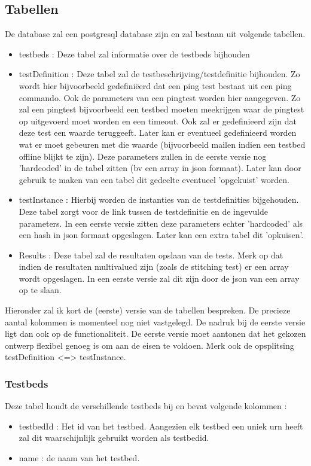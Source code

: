 \documentclass[11pt]{article}
\begin{document}
\subsection{Tabellen}
De database zal een postgresql database zijn en zal bestaan uit volgende tabellen.
\begin{itemize}
\item testbeds : Deze tabel zal informatie over de testbeds bijhouden
\item testDefinition : Deze tabel zal de testbeschrijving/testdefinitie bijhouden. Zo wordt hier bijvoorbeeld gedefini\"eerd dat een ping test bestaat uit een ping commando. Ook de parameters van een pingtest worden hier aangegeven. Zo zal een pingtest bijvoorbeeld een testbed moeten meekrijgen waar de pingtest op uitgevoerd moet worden en een timeout. Ook zal er gedefinieerd zijn dat deze test een waarde teruggeeft. Later kan er eventueel gedefinieerd worden wat er moet gebeuren met die waarde (bijvoorbeeld mailen indien een testbed offline blijkt te zijn).
Deze parameters zullen in de eerste versie nog 'hardcoded' in de tabel zitten (bv een array in json formaat). Later kan door gebruik te maken van een tabel dit gedeelte eventueel 'opgekuist' worden.
\item testInstance : Hierbij worden de instanties van de testdefinities bijgehouden. Deze tabel zorgt voor de link tussen de testdefinitie en de ingevulde parameters. In een eerste versie zitten deze parameters echter 'hardcoded' als een hash in json formaat opgeslagen. Later kan een extra tabel dit 'opkuisen'.
\item Results : Deze tabel zal de resultaten opslaan van de tests. Merk op dat indien de resultaten multivalued zijn (zoals de stitching test) er een array wordt opgeslagen. In een eerste versie zal dit zijn door de json van een array op te slaan.
\end{itemize}

Hieronder zal ik kort de (eerste) versie van de tabellen bespreken. De precieze aantal kolommen is momenteel nog niet vastgelegd. De nadruk bij de eerste versie ligt dan ook op de functionaliteit. De eerste versie moet aantonen dat het gekozen ontwerp flexibel genoeg is om aan de eisen te voldoen.
Merk ook de opsplitsing testDefinition <=> testInstance.

\subsubsection{Testbeds}
Deze tabel houdt de verschillende testbeds bij en bevat volgende kolommen :
\begin{itemize}
\item testbedId : Het id van het testbed. Aangezien elk testbed een uniek urn heeft zal dit waarschijnlijk gebruikt worden als testbedid.
\item name : de naam van het testbed.
\end{itemize}
\end{document}
